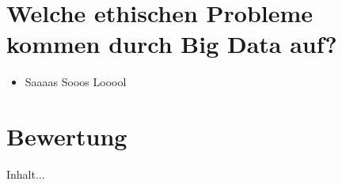 \documentclass[10pt,a4paper]{beamer}
\begin{document}
\section{Welche ethischen Probleme kommen durch Big Data auf?}
\begin{frame}
\begin{itemize}
\frametitle{Welche ethischen Probleme kommen durch Big Data auf?}
\item  Saaaas Sooos Looool
\end{itemize}
\end{frame}

\section{Bewertung}
\begin{frame}
Inhalt...
\end{frame}
\end{document}

